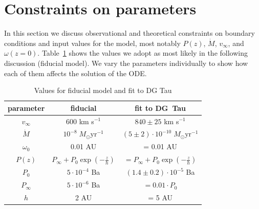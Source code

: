 \documentclass{emulateapj}
\begin{document}
\section{Constraints on parameters}
\label{sect:parameters}
In this section we discuss observational and theoretical constraints on boundary conditions and input values for the model, most notably $P(z)$, $\dot M$, $v_\infty$, and $\omega(z=0)$. Table~\ref{tab:fiducial} shows the values we adopt as most likely in the following discussion (fiducial model). We vary the parameters individually to show how each of them affects the solution of the ODE. 
\begin{table}
\caption{\label{tab:fiducial}Values for fiducial model and fit to DG Tau}
\begin{tabular}{ccc}
\hline\hline
parameter & fiducial & fit to DG~Tau\\
\hline
$v_\infty$ & 600 km s$^{-1}$ & $840\pm25$ km s$^{-1}$\\
$\dot M$ & $10^{-8}\;M_\odot\textrm{yr}^{-1}$ & $(5\pm2)\cdot10^{-10}\;M_\odot\textrm{yr}^{-1}$\\
$\omega_0$ & 0.01 AU & = 0.01 AU\tablenotemark{a}\\
$P(z)$ & $P_\infty+P_0\exp\left(-\frac{z}{h}\right)$ & $=P_\infty+P_0\exp\left(-\frac{z}{h}\right)$\\
$P_0$ & $5\cdot 10^{-4}$ Ba &  $(1.4\pm0.2)\cdot 10^{-5}$ Ba\\
$P_\infty$ & $5\cdot 10^{-6}$ Ba & $=0.01\cdot P_0$\\
$h$ & 2 AU & = 5 AU\tablenotemark{a}\\
\hline
\end{tabular}
\end{table}
\end{document}
